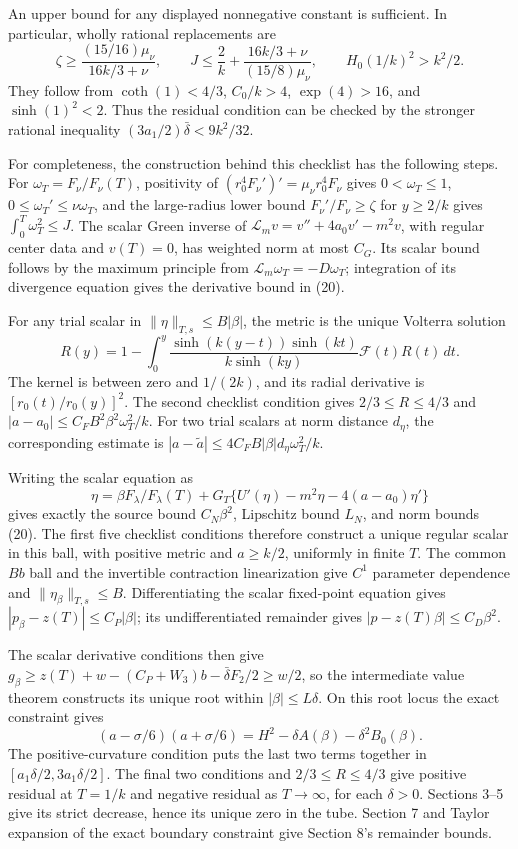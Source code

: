 \documentclass[11pt]{article}
\begin{document}
An upper bound for any displayed nonnegative constant is sufficient. In
particular, wholly rational replacements are
\[
 \zeta\geq\frac{(15/16)\mu_\nu}{16k/3+\nu},\qquad
 J\leq\frac2k+\frac{16k/3+\nu}{(15/8)\mu_\nu},
 \qquad H_0(1/k)^2>k^2/2.
\]
They follow from \(\coth(1)<4/3\), \(C_0/k>4\), \(\exp(4)>16\),
and \(\sinh(1)^2<2\). Thus the residual condition can be checked by the
stronger rational inequality \((3a_1/2)\bar\delta<9k^2/32\).

For completeness, the construction behind this checklist has the following
steps. For \(\omega_T=F_\nu/F_\nu(T)\), positivity of
\((r_0^4F_\nu')'=\mu_\nu r_0^4F_\nu\) gives
\(0<\omega_T\leq1\), \(0\leq\omega_T'\leq\nu\omega_T\), and the
large-radius lower bound \(F_\nu'/F_\nu\geq\zeta\) for \(y\geq2/k\)
gives \(\int_0^T\omega_T^2\leq J\). The scalar Green inverse of
\(\mathcal L_m v=v''+4a_0v'-m^2v\), with regular center data and \(v(T)=0\),
has weighted norm at most \(C_G\). Its scalar bound follows by the maximum
principle from \(\mathcal L_m\omega_T=-D\omega_T\); integration of its
divergence equation gives the derivative bound in (20).

For any trial scalar in \(\|\eta\|_{T,s}\leq B|\beta|\), the metric is the
unique Volterra solution
\[
 R(y)=1-\int_0^y
 \frac{\sinh(k(y-t))\sinh(kt)}{k\sinh(ky)}
 \mathcal F(t)R(t)\,dt.
\]
The kernel is between zero and \(1/(2k)\), and its radial derivative is
\([r_0(t)/r_0(y)]^2\). The second checklist condition gives
\(2/3\leq R\leq4/3\) and
\(|a-a_0|\leq C_FB^2\beta^2\omega_T^2/k\).
For two trial scalars at norm distance \(d_\eta\), the corresponding estimate
is \(|a-\widetilde a|\leq4C_FB|\beta|d_\eta\omega_T^2/k\).

Writing the scalar equation as
\[
 \eta=\beta F_\lambda/F_\lambda(T)
 +G_T\{U'(\eta)-m^2\eta-4(a-a_0)\eta'\}
\]
gives exactly the source bound \(C_N\beta^2\), Lipschitz bound \(L_N\),
and norm bounds (20). The first five checklist conditions therefore construct
a unique regular scalar in this ball, with positive metric and \(a\geq k/2\),
uniformly in finite \(T\). The common \(Bb\) ball and the invertible
contraction linearization give \(C^1\) parameter dependence and
\(\|\eta_\beta\|_{T,s}\leq B\). Differentiating the scalar fixed-point
equation gives \(|p_\beta-z(T)|\leq C_P|\beta|\); its undifferentiated
remainder gives \(|p-z(T)\beta|\leq C_D\beta^2\).

The scalar derivative conditions then give
\(g_\beta\geq z(T)+w-(C_P+W_3)b-\bar\delta F_2/2\geq w/2\), so the
intermediate value theorem constructs its unique root within
\(|\beta|\leq L\delta\). On this root locus the exact constraint gives
\[
 (a-\sigma/6)(a+\sigma/6)
  =H^2-\delta A(\beta)-\delta^2B_0(\beta).
\]
The positive-curvature condition puts the last two terms together in
\([a_1\delta/2,3a_1\delta/2]\). The final two conditions and
\(2/3\leq R\leq4/3\) give positive residual at \(T=1/k\) and negative
residual as \(T\to\infty\), for each \(\delta>0\). Sections 3--5 give its
strict decrease, hence its unique zero in the tube. Section 7 and Taylor
expansion of the exact boundary constraint give Section 8's remainder bounds.
\end{document}
